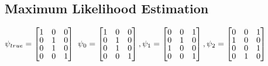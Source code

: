 \subsection{Maximum Likelihood Estimation}
$\psi_{true} =
\begin{bmatrix} \vspace{-2pt}
	1 & 0 & 0 \\  \vspace{-2pt}
	0 & 1 & 0 \\  \vspace{-2pt}
	0 & 1 & 0 \\  \vspace{-1pt}
	0 & 0 & 1
\end{bmatrix}$
$\psi_{0} =
\begin{bmatrix} \vspace{-2pt}
1 & 0 & 0 \\  \vspace{-2pt}
0 & 1 & 0 \\  \vspace{-2pt}
0 & 1 & 0 \\  \vspace{-1pt}
0 & 0 & 1
\end{bmatrix}, 
\psi_{1} =
\begin{bmatrix} \vspace{-2pt}
0 & 0 & 1 \\  \vspace{-2pt}
0 & 1 & 0 \\  \vspace{-2pt}
1 & 0 & 0 \\  \vspace{-1pt}
0 & 0 & 1 
\end{bmatrix},
\psi_{2} =
\begin{bmatrix} \vspace{-2pt}
0 & 0 & 1 \\  \vspace{-2pt}
1 & 0 & 0 \\  \vspace{-2pt}
0 & 0 & 1 \\  \vspace{-1pt}
0 & 1 & 0  
\end{bmatrix}$

